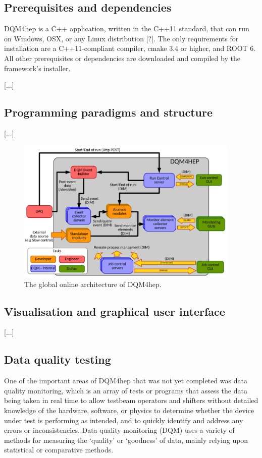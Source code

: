 \subsection{Prerequisites and dependencies}

DQM4hep is a C++ application, written in the C++11 standard, that can run on Windows, OSX, or any Linux distribution [?]. The only requirements for installation are a C++11-compliant compiler, cmake 3.4 or higher, and ROOT 6. All other prerequisites or dependencies are downloaded and compiled by the framework's installer. 

[...]

\subsection{Programming paradigms and structure}
[...]

\begin{figure}[h]
	\centering
	\includegraphics[width=0.95\textwidth]{../Pictures/GlobalArchitectureDiagram.pdf}
	\caption{The global online architecture of DQM4hep.}
	\label{figure:daq/dqm4hep/architecture}
\end{figure}

\subsection{Visualisation and graphical user interface}
[...]

\subsection{Data quality testing}
One of the important areas of DQM4hep that was not yet completed was data quality monitoring, which is an array of tests or programs that assess the data being taken in real time to allow testbeam operators and shifters without detailed knowledge of the hardware, software, or physics to determine whether the device under test is performing as intended, and to quickly identify and address any errors or inconsistencies. Data quality monitoring (DQM) uses a variety of methods for measuring the `quality' or `goodness' of data, mainly relying upon statistical or comparative methods.

